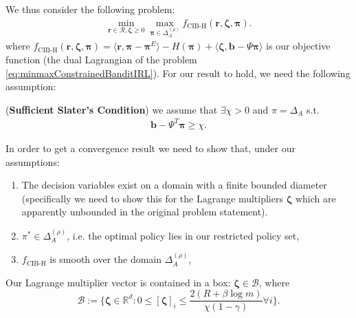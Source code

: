 We thus consider the following problem:
\begin{equation}
    \label{eq:dualConstrainedBanditIRLShannon}
    \begin{aligned}
        \min_{\bm{r}\in\mathcal{R},\bm{\zeta} \geq 0}\max_{\bm{\pi}\in\Delta_{A}^{(\rho)}} f_\text{CIB-H}(\bm{r},\bm{\zeta},\bm{\pi}).
    \end{aligned}
\end{equation}
where $f_\text{CIB-H}(\bm{r},\bm{\zeta},\bm{\pi}) = \langle \bm{r}, \bm{\pi}-\bm{\pi}^E\rangle - H(\bm{\pi}) + \langle \bm{\zeta}, \bm{b}-\Psi \bm{\pi} \rangle$ is our objective function (the dual Lagrangian of the problem \ref{eq:minmaxConstrainedBanditIRL}). For our result to hold, we need the following assumption:
\begin{assumption}
    \label{assumption:slater_with_margin_bandit}
    (\textbf{Sufficient Slater's Condition}) we assume that $\exists \chi > 0$ and $\pi = \Delta_A$ s.t.
    \begin{align*}
        \bm{b} - \Psi^T \bm{\pi} \geq \chi.
    \end{align*}
\end{assumption}
\noindent
In order to get a convergence result we need to show that, under our assumptions:
\begin{enumerate}
    \item The decision variables exist on a domain with a finite bounded diameter (specifically we need to show this for the Lagrange multipliers $\bm{\zeta}$ which are apparently unbounded in the original problem statement).
    \item $\pi^* \in \Delta_{A}^{(\rho)}$, i.e. the optimal policy lies in our restricted policy set,
    \item $f_\text{CIB-H}$ is smooth over the domain $\Delta_{A}^{(\rho)}$,
\end{enumerate}


\begin{proposition}
    \label{prop:bounded_zeta} Our Lagrange multiplier vector is contained in a box: $\bm{\zeta} \in \mathcal{B}$, where 
    \[ \mathcal{B} := \Bigg\{ \bm{\zeta}\in\mathbb{R}^d : 0\leq[\bm{\zeta}]_i  \leq \frac{2(R +\beta \log m)}{\chi (1-\gamma)} \forall i \Bigg\}.\]
\end{proposition}

